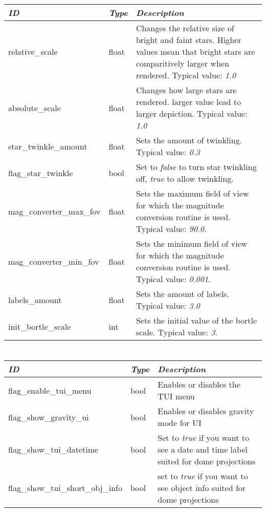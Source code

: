 \section{}\label{section-stars}

\begin{longtabu} to \textwidth {l|l|X}
\toprule
\emph{ID} & \emph{Type} & \emph{Description}\tabularnewline
\midrule
relative\_scale & float & Changes the relative size of
bright and faint stars. Higher values mean that bright stars are
comparitively larger when rendered. Typical value:
\emph{1.0}\tabularnewline
\midrule
absolute\_scale & float & Changes how large stars are
rendered. larger value lead to larger depiction. Typical value:
\emph{1.0}\tabularnewline
\midrule
star\_twinkle\_amount & float & Sets the amount of
twinkling. Typical value: \emph{0.3}\tabularnewline
\midrule
flag\_star\_twinkle & bool & Set to \emph{false} to turn
star twinkling off, \emph{true} to allow twinkling.\tabularnewline
\midrule
mag\_converter\_max\_fov & float & Sets the maximum field
of view for which the magnitude conversion routine is used. Typical
value: \emph{90.0}.\tabularnewline
\midrule
mag\_converter\_min\_fov & float & Sets the minimum field
of view for which the magnitude conversion routine is used. Typical
value: \emph{0.001}.\tabularnewline
\midrule
labels\_amount & float & Sets the amount of labels. Typical
value: \emph{3.0}\tabularnewline
\midrule
init\_bortle\_scale & int & Sets the initial value of the
bortle scale. Typical value: \emph{3}.\tabularnewline
\bottomrule
\end{longtabu}

\section{}\label{section-tui}

\begin{longtabu} to \textwidth {l|l|X}
\toprule
\emph{ID} & \emph{Type} & \emph{Description}\tabularnewline
\midrule
flag\_enable\_tui\_menu & bool & Enables or disables the TUI menu\tabularnewline
\midrule
flag\_show\_gravity\_ui & bool & Enables or disables gravity mode for UI\tabularnewline
\midrule
flag\_show\_tui\_datetime & bool & Set to \emph{true} if you want to see a date and time label suited for dome projections\tabularnewline
\midrule
flag\_show\_tui\_short\_obj\_info & bool & set to \emph{true} if you want to see object info suited for dome projections\tabularnewline
\bottomrule
\end{longtabu}

